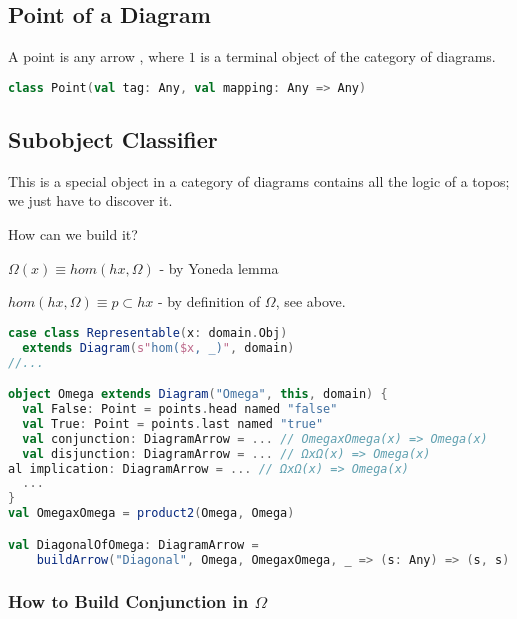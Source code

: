 \documentclass[10pt]{asme2ej}
\begin{document}
\subsection{Point of a Diagram}
A point is any arrow , where $1$ is a terminal object of the category of diagrams.

\begin{lstlisting}[language=Scala]
class Point(val tag: Any, val mapping: Any => Any)
\end{lstlisting}

\subsection{Subobject Classifier}
This is a special object in a category of diagrams contains all the logic of a topos; we just have to discover it.


How can we build it? 

$\Omega(x) \equiv hom(hx, \Omega)$ - by Yoneda lemma 

$hom(hx, \Omega)  \equiv {p \subset hx}$ - by definition of $\Omega$, see above.

\begin{lstlisting}[language=Scala]
case class Representable(x: domain.Obj)
  extends Diagram(s"hom($x, _)", domain)
//...

object Omega extends Diagram("Omega", this, domain) {
  val False: Point = points.head named "false"
  val True: Point = points.last named "true"
  val conjunction: DiagramArrow = ... // OmegaxOmega(x) => Omega(x)
  val disjunction: DiagramArrow = ... // ΩxΩ(x) => Omega(x)
al implication: DiagramArrow = ... // ΩxΩ(x) => Omega(x)
  ...
}
val OmegaxOmega = product2(Omega, Omega)

val DiagonalOfOmega: DiagramArrow =
    buildArrow("Diagonal", Omega, OmegaxOmega, _ => (s: Any) => (s, s)

\end{lstlisting}

\subsubsection{How to Build Conjunction in $\Omega$}

\end{document}
